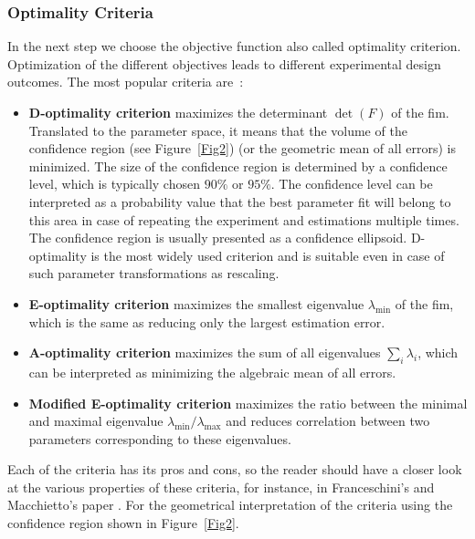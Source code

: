 \documentclass[graybox]{svmult}
\begin{document}
\subsubsection*{Optimality Criteria}
In the next step we choose the objective function also called optimality criterion.
Optimization of the different objectives leads to different experimental design outcomes.
The most popular criteria are~\cite{balsa-cantoe.bangaj.r.COMPUTINGOPTIMALDYNAMIC2008, dette_designing_1997, walter_qualitative_1990}:
\begin{itemize}
\item \textbf{D-optimality criterion} maximizes the determinant $\det (F)$ of the \ac{fim}.
 Translated to the parameter space, it means that the volume of the confidence region (see Figure~\ref{Fig2}) (or the geometric mean of all errors) is minimized.
 The size of the confidence region is determined by a confidence level, which is typically chosen $90 \%$ or $95 \%$.
 The confidence level can be interpreted as a probability value that the best
 parameter fit will belong to this area in case of repeating the experiment and estimations multiple times.
 The confidence region is usually presented as a confidence ellipsoid.
 D-optimality is the most widely used criterion and is suitable even in case of such parameter transformations as rescaling.
\item \textbf{E-optimality criterion} maximizes the smallest eigenvalue $\lambda_{\min}$ of the \ac{fim}, which is the same as reducing only the largest estimation error.
\item \textbf{A-optimality criterion} maximizes the sum of all eigenvalues $\sum_i \lambda_i$, which can be interpreted as minimizing the algebraic mean of all errors.
\item \textbf{Modified E-optimality criterion} maximizes the ratio between the minimal and maximal eigenvalue $\lambda_{\min} / \lambda_{\max}$ and reduces correlation between two parameters corresponding to these eigenvalues.

\end{itemize}
Each of the criteria has its pros and cons, so the reader should have a closer look at the various properties of these criteria, for instance, in Franceschini's and Macchietto's paper \cite{franceschiniModelbasedDesignExperiments2008}.
For the geometrical interpretation of the criteria using the confidence region shown in Figure~\ref{Fig2}.
%
%
\end{document}
